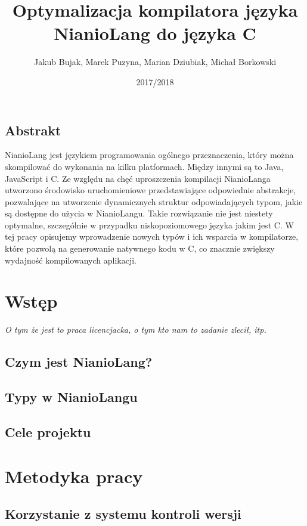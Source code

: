 \documentclass[11pt]{article}
\title{Optymalizacja kompilatora języka NianioLang do języka C}
\author{Jakub Bujak, Marek Puzyna, Marian Dziubiak, Michał Borkowski}
\date{2017/2018}
\begin{document}
    \maketitle

    \subsection*{Abstrakt}
    NianioLang jest językiem programowania ogólnego przeznaczenia, który można
    skompilować do wykonania na kilku platformach. Między innymi są to Java, 
    JavaScript i C. Ze względu na chęć uproszczenia kompilacji NianioLanga
    utworzono środowisko uruchomieniowe przedstawiające odpowiednie abstrakcje,
    pozwalające na utworzenie dynamicznych struktur odpowiadających typom,
    jakie są dostępne do użycia w NianioLangu. Takie rozwiązanie nie jest
    niestety optymalne, szczególnie w przypadku niskopoziomowego języka jakim
    jest C. W tej pracy opisujemy wprowadzenie nowych typów i ich wsparcia 
    w kompilatorze, które pozwolą na generowanie natywnego kodu w C, co znacznie
    zwiększy wydajność kompilowanych aplikacji.

    \tableofcontents

    \newpage

    \section{Wstęp}
    \emph{O tym że jest to praca licencjacka, o tym kto nam to zadanie zlecił,
          itp.}
    \subsection{Czym jest NianioLang?}
    \subsection{Typy w NianioLangu}
    \subsection{Cele projektu}

    \section{Metodyka pracy}
    \subsection{Korzystanie z systemu kontroli wersji}
\end{document}

